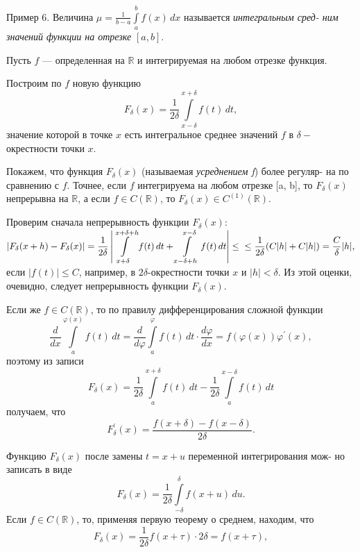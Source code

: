 \documentclass[a4paper, 10pt]{book}
\begin{document}
    \par
    Пример 6. Величина $ \mu = \frac{1}{b - a} \int\limits_{a}^{b} f(x) \,dx $ называется \textit{интегральным сред-
    ним значений функции на отрезке} $[a, b]$.
    \par
    Пусть $f$ — определенная на $\mathbb{R}$ и интегрируемая на любом отрезке функция.
    \par
    Построим по $f$ новую функцию
    \[
    F_\delta(x) = \frac{1}{2\delta} \int\limits_{x - \delta}^{x + \delta} f(t) \,dt,
    \]
    значение которой в точке $x$ есть интегральное среднее значений $f$ в
    $\delta-$окрестности точки $x$.
    \par
    Покажем, что функция $F_\delta(x)$ (называемая \textit{усреднением f}) более регуляр-
    на по сравнению с $f$. Точнее, если $f$ интегрируема на любом отрезке [a, b], то $F_\delta(x)$ непрерывна на $\mathbb{R}$, а если $f \in C(\mathbb{R})$, то $F_\delta(x) \in  C^{(1)}(\mathbb{R}).$
    \par
    Проверим сначала непрерывность функции $F_\delta(x)$:
    \newline
    $
    \displaystyle
    \left| F_\delta(x + h) - F_\delta(x) \right| =
    \frac{1}{2\delta}
    \left|
    \int\limits_{x+\delta}^{x+\delta+h} f(t) \,dt +
    \int\limits_{x-\delta+h}^{x-\delta} f(t) \,dt
    \right|
    \leq
    \\
    \null\hfill \leq\frac{1}{2\delta}(C|h|+C|h|) = \frac{C}{\delta}|h|,
    $
    \newline
    если $|f(t)| \leq C$, например, в $2\delta$-окрестности точки $x$ и $|h|<\delta$. Из этой оценки, очевидно, следует непрерывность функции $F_{\delta}(x)$.
    \par
    Если же $f \in C(\mathbb{R})$, то по правилу дифференцирования сложной функции
    \[
    \frac{d}{dx} \int\limits_{a}^{\varphi(x)} f(t) \,dt =
    \frac{d}{d\varphi} \int\limits_{a}^{\varphi} f(t) \,dt \cdot
    \frac{d\varphi}{dx} = f(\varphi(x))\varphi^{'}(x),
    \]
    поэтому из записи
    \[
    F_\delta(x) = \frac{1}{2\delta} \int\limits_{a}^{x + \delta} f(t) \,dt - \frac{1}{2\delta} \int\limits_{a}^{x - \delta} f(t) \,dt
    \]
    получаем, что
    \[
    F_{\delta}^{'}(x) = \frac{f(x + \delta) - f(x-\delta)}{2\delta}.
    \]
    \par
    Функцию $F_{\delta}(x)$ после замены $t = x + u$ переменной интегрирования мож-
    но записать в виде
    \[
    F_{\delta}(x) = \frac{1}{2\delta} \int\limits_{-\delta}^{\delta}
    f(x + u) \,du.
    \]
    Если $f \in C(\mathbb{R})$, то, применяя первую теорему о среднем, находим, что
    \[
    F_{\delta}(x) = \frac{1}{2\delta}f(x + \tau) \cdot 2\delta = f(x+\tau),
    \]
    
\end{document}
